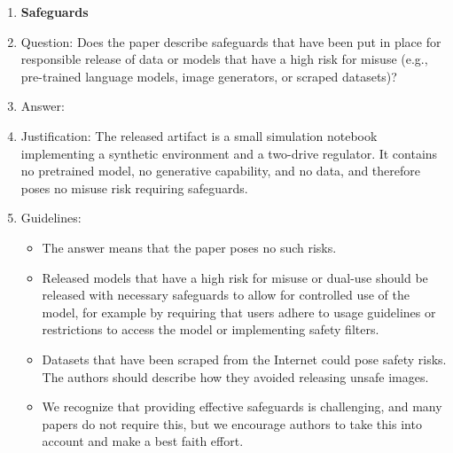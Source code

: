 \begin{enumerate}
\item {\bf Safeguards}
    \item[] Question: Does the paper describe safeguards that have been put in place for responsible release of data or models that have a high risk for misuse (e.g., pre-trained language models, image generators, or scraped datasets)?
    \item[] Answer: \answerNA{}
    \item[] Justification: The released artifact is a small simulation notebook implementing a synthetic environment and a two-drive regulator. It contains no pretrained model, no generative capability, and no data, and therefore poses no misuse risk requiring safeguards.
    \item[] Guidelines:
    \begin{itemize}
        \item The answer \answerNA{} means that the paper poses no such risks.
        \item Released models that have a high risk for misuse or dual-use should be released with necessary safeguards to allow for controlled use of the model, for example by requiring that users adhere to usage guidelines or restrictions to access the model or implementing safety filters. 
        \item Datasets that have been scraped from the Internet could pose safety risks. The authors should describe how they avoided releasing unsafe images.
        \item We recognize that providing effective safeguards is challenging, and many papers do not require this, but we encourage authors to take this into account and make a best faith effort.
    \end{itemize}


\end{enumerate}
